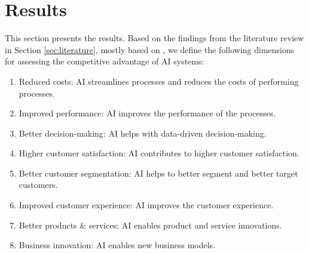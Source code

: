 \section{Results}
\label{sec:results}

This section presents the results. Based on the findings from the literature review in Section \ref{sec:literature},
mostly based on \citet{iansitiCompetingAgeAI2020,hoArtificialIntelligenceFirm2022}, we define the following dimensions
for assessing the competitive advantage of AI systems:

\begin{enumerate}
    \item Reduced costs: AI streamlines processes and reduces the costs of performing processes.
    \item Improved performance: AI improves the performance of the processes.
    \item Better decision-making: AI helps with data-driven decision-making.
    \item Higher customer satisfaction: AI contributes to higher customer satisfaction.
    \item Better customer segmentation: AI helps to better segment and better target customers.
    \item Improved customer experience: AI improves the customer experience.
    \item Better products \& services: AI enables product and service innovations.
    \item Business innovation: AI enables new business models.
\end{enumerate}



